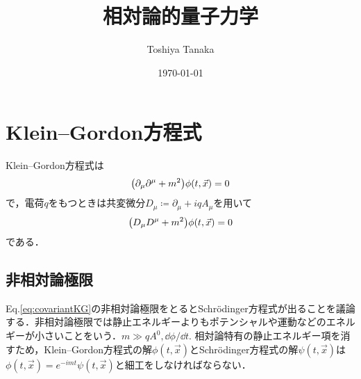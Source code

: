 \documentclass[english, dvipdfmx, a4paper]{jsarticle}
\title{相対論的量子力学}
\author{Toshiya Tanaka}
\date{\today}
\theoremstyle{break}
\begin{document}
	\maketitle

	\section{Klein--Gordon方程式}
	Klein--Gordon方程式は
	\begin{equation}
			\qty(\partial_\mu\partial^{\mu} + m^2)\phi(t, \vec{x}) = 0\label{eq:klein-gordon}
	\end{equation}
	で，電荷$q $をもつときは共変微分$D_{\mu}\coloneqq \partial_{\mu} + iqA_{\mu} $を用いて
	\begin{equation}
			\qty(D_\mu D^{\mu} + m^2)\phi(t, \vec{x}) = 0\label{eq:covariantKG}
	\end{equation}
	である．

	\subsection{非相対論極限}
	Eq.\eqref{eq:covariantKG}の非相対論極限をとるとSchr\"{o}dinger方程式が出ることを議論する．非相対論極限では静止エネルギーよりもポテンシャルや運動などのエネルギーが小さいことをいう．$m \gg qA^0, \dd{\phi}/\dd{t}. $
	相対論特有の静止エネルギー項を消すため，Klein--Gordon方程式の解$\phi(t, \vec{x}) $とSchr\"{o}dinger方程式の解$\psi(t, \vec{x}) $は$\phi(t, \vec{x}) = e^{-imt}\psi(t, \vec{x}) $と細工をしなければならない．
\end{document}
